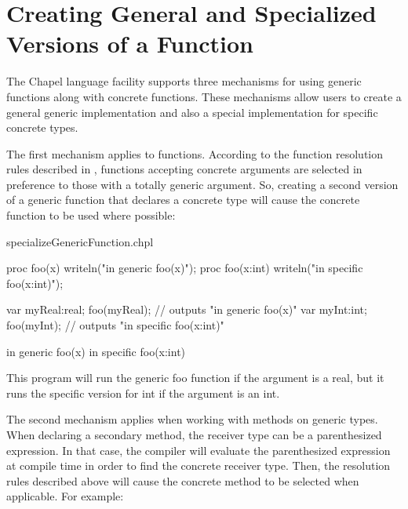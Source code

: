\section{Creating General and Specialized Versions of a Function}
\label{Creating_General_and_Specialized_Versions_of_a_Function}

The Chapel language facility supports three mechanisms for using generic
functions along with concrete functions. These mechanisms allow users to
create a general generic implementation and also a special implementation
for specific concrete types.

The first mechanism applies to functions.
According to the function resolution rules described in
, functions accepting concrete arguments are
selected in preference to those with a totally generic argument. So,
creating a second version of a generic function that declares a concrete
type will cause the concrete function to be used where possible:

\begin{chapelexample}{specializeGenericFunction.chpl}
\begin{chapel}
proc foo(x) {
  writeln("in generic foo(x)");
}
proc foo(x:int) {
  writeln("in specific foo(x:int)");
}

var myReal:real;
foo(myReal); // outputs "in generic foo(x)"
var myInt:int;
foo(myInt); // outputs "in specific foo(x:int)"
\end{chapel}
\begin{chapeloutput}
in generic foo(x)
in specific foo(x:int)
\end{chapeloutput}
\end{chapelexample}

This program will run the generic foo function if the argument is a real,
but it runs the specific version for int if the argument is an int.

The second mechanism applies when working with methods on generic types.
When declaring a secondary method, the receiver type can be a
parenthesized expression. In that case, the compiler will evaluate the
parenthesized expression at compile time in order to find the concrete
receiver type. Then, the resolution rules described above will cause the
concrete method to be selected when applicable. For example:

